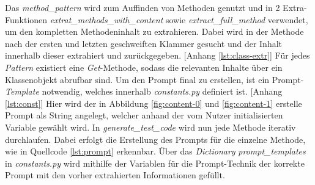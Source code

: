 \vspace{-.3cm}
Das \textit{method\_pattern} wird zum Auffinden von Methoden genutzt und in 2 Extra-Funktionen \textit{extrat\_methods\_with\_content} sowie \textit{extract\_full\_method} verwendet, um den kompletten Methodeninhalt zu extrahieren. Dabei wird in der Methode nach der ersten und letzten geschweiften Klammer gesucht und der Inhalt innerhalb dieser extrahiert und zurückgegeben. [Anhang \ref{lst:class-extr}] Für jedes \textit{Pattern} existiert eine \textit{Get}-Methode, sodass die relevanten Inhalte über ein Klassenobjekt abrufbar sind. Um den Prompt final zu erstellen, ist ein Prompt-\textit{Template} notwendig, welches innerhalb \textit{constants.py} definiert ist. [Anhang \ref{lst:const}] Hier wird der in Abbildung \ref{fig:content-0} und \ref{fig:content-1} erstelle Prompt als String angelegt, welcher anhand der vom Nutzer initialisierten Variable gewählt wird. In \textit{generate\_test\_code} wird nun jede Methode iterativ durchlaufen. Dabei erfolgt die Erstellung des Prompts für die einzelne Methode, wie in Quellcode \ref{lst:prompt} erkennbar. Über das \textit{Dictionary} \textit{prompt\_templates} in \textit{constants.py} wird mithilfe der Variablen für die Prompt-Technik der korrekte Prompt mit den vorher extrahierten Informationen gefüllt.\\
\vspace{-.3cm}

